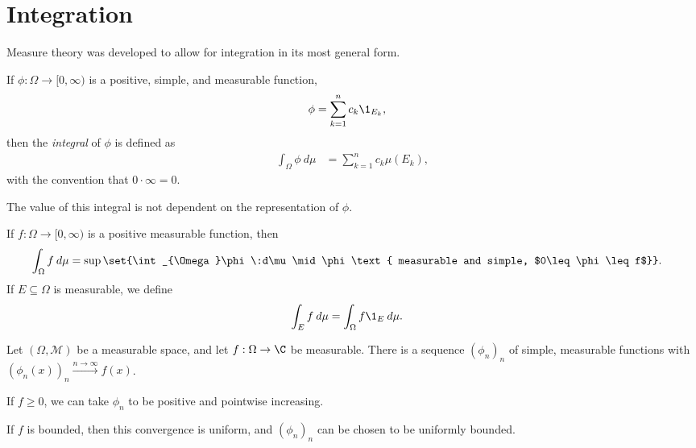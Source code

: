 \section{Integration}%
Measure theory was developed to allow for integration in its most general form.
\begin{definition}
  If $\phi\colon \Omega\rightarrow [0,\infty)$ is a positive, simple, and measurable function, 
  \begin{align*}
    \phi &= \sum_{k=1}^{n}c_k\1_{E_k},
  \end{align*}
  then the \textit{integral} of $\phi$ is defined as
  \begin{align*}
    \int_{\Omega}\phi\:d\mu &= \sum_{k=1}^{n}c_k\mu\left(E_k\right),
  \end{align*}
  with the convention that $0\cdot \infty = 0$.
\end{definition}
\begin{fact}
The value of this integral is not dependent on the representation of $\phi$.
\end{fact}
\begin{definition}
  If $f\colon \Omega\rightarrow [0,\infty)$ is a positive measurable function, then
  \begin{align*}
    \int_{\Omega}f\:d\mu &= \sup\set{\int_{\Omega}\phi\:d\mu\mid \phi\text{ measurable and simple, $0\leq \phi \leq f$}}.
  \end{align*}
  If $E\subseteq \Omega$ is measurable, we define
  \begin{align*}
    \int_{E} f\:d\mu &= \int_{\Omega}f\1_{E}\:d\mu.
  \end{align*}
\end{definition}
\begin{proposition}
  Let $\left(\Omega,\mathcal{M}\right)$ be a measurable space, and let $f:\Omega\rightarrow \C$ be measurable. There is a sequence $\left(\phi_{n}\right)_n$ of simple, measurable functions with $\left(\phi_{n}\left(x\right)\right)_{n}\xrightarrow{n\rightarrow\infty}f(x)$.\newline

  If $f\geq 0$, we can take $\phi_n$ to be positive and pointwise increasing.\newline

  If $f$ is bounded, then this convergence is uniform, and $\left(\phi_{n}\right)_n$ can be chosen to be uniformly bounded.
\end{proposition}

